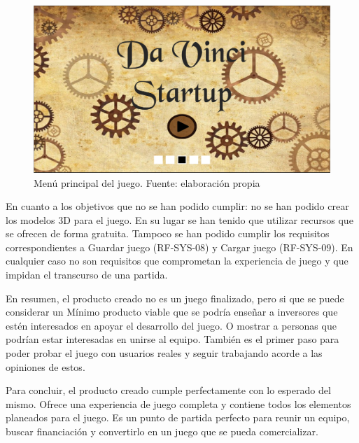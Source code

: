 \begin{figure}
\begin{center}
\includegraphics[scale=0.5]{imagenes/titulo.png}
\caption{Menú principal del juego.  Fuente: elaboración propia}
\label{titulo}
\end{center}
\end{figure}

En cuanto a los objetivos que no se han podido cumplir: no se han podido crear los modelos 3D para el juego. En su lugar se han tenido que utilizar recursos que se ofrecen de forma gratuita. Tampoco se han podido cumplir los requisitos correspondientes a Guardar juego (RF-SYS-08) y Cargar juego (RF-SYS-09). En cualquier caso no son requisitos que comprometan la experiencia de juego y que impidan el transcurso de una partida. 

En resumen, el producto creado no es un juego finalizado, pero si que se puede considerar un Mínimo producto viable que se podría enseñar a inversores que estén interesados en apoyar el desarrollo del juego. O mostrar a personas que podrían estar interesadas en unirse al equipo. También es el primer paso para poder probar el juego con usuarios reales y seguir trabajando acorde a las opiniones de estos. 

Para concluir, el producto creado cumple perfectamente con lo esperado del mismo. Ofrece una experiencia de juego completa y contiene todos los elementos planeados para el juego. Es un punto de partida perfecto para reunir un equipo, buscar financiación y convertirlo en un juego que se pueda comercializar.